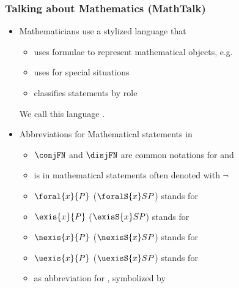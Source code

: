 \documentclass[notes,mh]{mikoslides}
\begin{document}
\begin{module}[id=mathtalk]

\begin{frame}[label=slide.mathtalk]
  \frametitle{Talking about Mathematics (MathTalk)}
  \begin{itemize}
 \item
    \begin{definition}[id=math-vernacular.def]
      Mathematicians use a stylized language that
      \begin{itemize}
      \item uses formulae to represent mathematical objects, e.g.
     \item uses  for special situations
      \item classifies statements by role 
      \end{itemize}
      We call this language .
    \end{definition}
  \item
    \begin{definition}[id=mathtalk.def,
      for={conj,disj,negate,foral,foralS,exis,exisS,biimpl,imply,uexis,uexisS,nexis,nexisS}]
      Abbreviations for Mathematical statements in 
      \begin{itemize}
      \item $\conjFN$ and $\disjFN$ are common notations for  and 
      \item {} is in mathematical statements often denoted with $\neg$
      \item $\foral{x}{P}$ ($\foralS{x}SP$) stands for 
      \item $\exis{x}{P}$ ($\exisS{x}SP$) stands for 
      \item $\nexis{x}{P}$ ($\nexisS{x}SP$) stands for 
      \item $\uexis{x}{P}$ ($\uexisS{x}SP$) stands for 
      \item {} as abbreviation for , symbolized by

\end{itemize}
\end{definition}
\end{itemize}
\end{frame}
\end{module}
\end{document}
